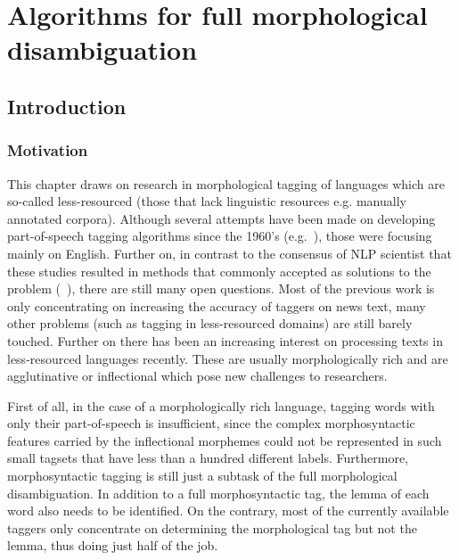 \chapter{Algorithms for full morphological disambiguation}

\section{Introduction}

\subsection{Motivation}

This chapter draws on research in morphological tagging of languages which are so-called less-resourced (those that lack linguistic resources e.g. manually annotated corpora).
Although several attempts have been made on developing part-of-speech tagging algorithms since the 1960’s (e.g.~\cite{}), those were focusing mainly on English.
Further on, in contrast to the consensus of NLP scientist that these studies resulted in methods that commonly accepted as solutions to the problem (~\cite{}), there are still many open questions.
Most of the previous work is only concentrating on increasing the accuracy of taggers on news text, many other problems (such as tagging in less-resourced domains) are still barely touched.
Further on there has been an increasing interest on processing texts in less-resourced languages recently.
These are usually morphologically rich and are agglutinative or inflectional which pose new challenges to researchers.

First of all, in the case of a morphologically rich language, tagging words with only their part-of-speech is insufficient, since the complex morphosyntactic features carried by the inflectional morphemes could not be represented in such small tagsets that have less than a hundred different labels.
Furthermore, morphosyntactic tagging is still just a subtask of the full morphological disambiguation.
In addition to a full morphosyntactic tag, the lemma of each word also needs to be identified.
On the contrary, most of the currently available taggers only concentrate on determining the morphological tag but not the lemma, thus doing just half of the job.


